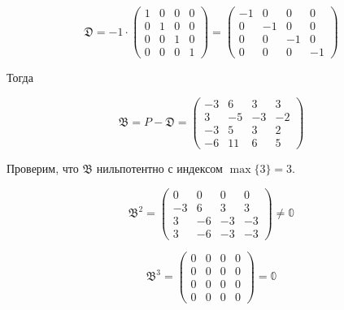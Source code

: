 \documentclass[12pt, a4paper]{article}
\begin{document}
    \begin{equation}
        \mathfrak{D} = -1 \cdot \left(\begin{matrix}
            1 & 0 & 0 & 0 \\
            0 & 1 & 0 & 0 \\
            0 & 0 & 1 & 0 \\
            0 & 0 & 0 & 1
        \end{matrix}\right) = \left(\begin{matrix}
            -1 & 0 & 0 & 0 \\
            0 & -1 & 0 & 0 \\
            0 & 0 & -1 & 0 \\
            0 & 0 & 0 & -1
        \end{matrix}\right)
    \end{equation}

    Тогда 

    \begin{equation}
        \mathfrak{B} = P - \mathfrak{D} = 
        \left(\begin{matrix}
            -3 & 6 & 3 & 3 \\
            3 & -5 & -3 & -2 \\
            -3 & 5 & 3 & 2 \\
            -6 & 11 & 6 & 5
        \end{matrix}\right)
    \end{equation}

    Проверим, что $\mathfrak{B}$ нильпотентно с индексом $\max\{3\} = 3$.

    \begin{equation}
        \mathfrak{B}^2 = \left(\begin{matrix}
            0 & 0 & 0 & 0 \\
            -3 & 6 & 3 & 3 \\
            3 & -6 & -3 & -3 \\
            3 & -6 & -3 & -3
        \end{matrix}\right) \neq \mathbb{0}
    \end{equation}

    \begin{equation}
        \mathfrak{B}^3 = \left(\begin{matrix}
            0 & 0 & 0 & 0 \\
            0 & 0 & 0 & 0 \\
            0 & 0 & 0 & 0 \\
            0 & 0 & 0 & 0
        \end{matrix}\right) = \mathbb{0}
    \end{equation}
\end{document}
